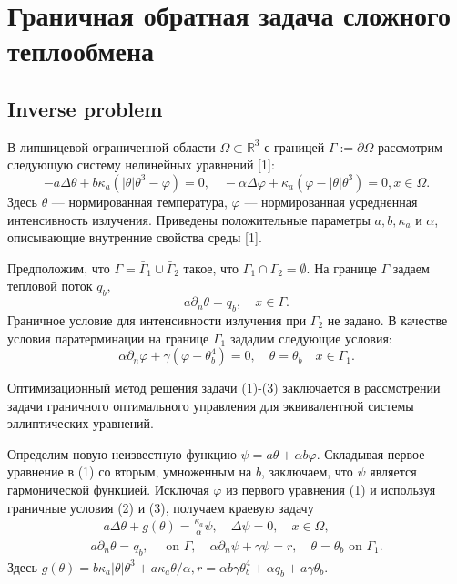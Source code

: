\section{Граничная обратная задача сложного теплообмена}

\subsection{Inverse problem}
В липшицевой ограниченной области $\Omega \subset \mathbb{R}^{3}$ с границей
$\Gamma:=\partial \Omega$ рассмотрим следующую систему нелинейных уравнений [1]:
\[
    -a \Delta \theta+b \kappa_{a}\left(|\theta| \theta^{3}-\varphi\right)=0,
    \quad-\alpha \Delta \varphi+\kappa_{a}\left(\varphi-|\theta| \theta^{3}\right)=0, x \in \Omega.
\]
Здесь $\theta$ — нормированная температура, $\varphi$ — нормированная усредненная интенсивность излучения.
Приведены положительные параметры $a, b, \kappa_{a}$ и $\alpha$, описывающие внутренние свойства среды [1].


Предположим, что $\Gamma=\bar{\Gamma}_{1} \cup \bar{\Gamma}_{2}$ такое,
что $\Gamma_{1} \cap \Gamma_{2}=\emptyset$.
На границе $\Gamma$ задаем тепловой поток $q_{b}$,
\[
    a \partial_{n} \theta=q_{b}, \quad x \in \Gamma.
\]
Граничное условие для интенсивности излучения при $\Gamma_{2}$ не задано.
В качестве условия паратерминации на границе $\Gamma_{1}$ зададим следующие условия:
\[
    \alpha \partial_{n} \varphi+\gamma\left(\varphi-\theta_{b}^{4}\right)=0,
    \quad \theta=\theta_{b} \quad x \in \Gamma_{ 1} .
\]

Оптимизационный метод решения задачи (1)-(3) заключается в рассмотрении задачи
граничного оптимального управления для эквивалентной системы эллиптических уравнений.

Определим новую неизвестную функцию $\psi=a \theta+\alpha b \varphi$.
Складывая первое уравнение в (1) со вторым, умноженным на $b$, заключаем,
что $\psi$ является гармонической функцией. Исключая $\varphi$ из первого
уравнения (1) и используя граничные условия (2) и (3), получаем краевую задачу
\[
    \begin{gathered}
        \quad a \Delta \theta+g(\theta)=\frac{\kappa_{a}}{\alpha} \psi, \quad \Delta \psi=0, \quad x \in \Omega, \\
        a \partial_{n} \theta=q_{b}, \quad \text { on } \Gamma, \quad \alpha \partial_{n} \psi+\gamma \psi=r, \quad \theta=\theta_{ b} \text { on } \Gamma_{1} .
    \end{gathered}
\]
Здесь $g(\theta)=b \kappa_{a}|\theta| \theta^{3}+a \kappa_{a} \theta / \alpha,
r=\alpha b \gamma \theta_{b}^{4}+\alpha q_{b}+a \gamma \theta_{b }$.


